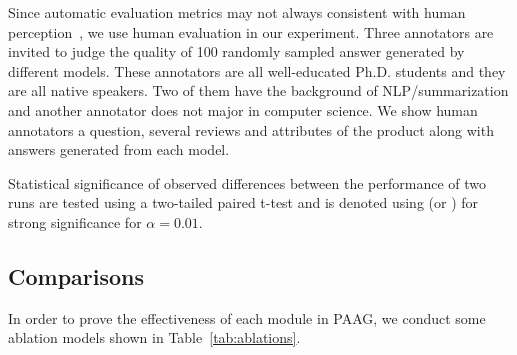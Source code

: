 Since automatic evaluation metrics may not always consistent with human perception~\cite{Stent2005EvaluatingEM}, we use human evaluation in our experiment. 
Three annotators are invited to judge the quality of 100 randomly sampled answer generated by different models. 
These annotators are all well-educated Ph.D. students and they are all native speakers. 
Two of them have the background of NLP/summarization and another annotator does not major in computer science.
We show human annotators a question, several reviews and attributes of the product along with answers generated from each model.

Statistical significance of observed differences between the performance of two runs are tested using a two-tailed paired t-test and is denoted using \dubbelop (or \dubbelneer) for strong significance for $\alpha = 0.01$. 

\subsection{Comparisons} \label{sec:baselines}

In order to prove the effectiveness of each module in PAAG, we conduct some ablation models shown in Table~\ref{tab:ablations}.

